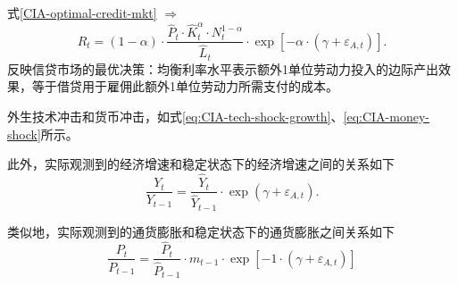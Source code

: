 式\eqref{CIA-optimal-credit-mkt} $\Rightarrow$
\begin{equation}
  \label{CIA-optimal-credit-mkt-scal}
  R_t = \left( 1-\alpha \right) \cdot \frac{\hat{P}_t \cdot \hat{K}_t^{\alpha} \cdot N_t^{1 - \alpha}}{\hat{L}_t} \cdot \exp \left[ -\alpha \cdot \left( \gamma + \varepsilon_{A,t} \right) \right].
\end{equation}
反映信贷市场的最优决策：均衡利率水平表示额外1单位劳动力投入的边际产出效果，等于借贷用于雇佣此额外1单位劳动力所需支付的成本。

外生技术冲击和货币冲击，如式\eqref{eq:CIA-tech-shock-growth}、\eqref{eq:CIA-money-shock}所示。

此外，实际观测到的经济增速和稳定状态下的经济增速之间的关系如下
\begin{equation}
  \label{eq:CIA-gdp-growth-obs-stab}
  \frac{Y_t}{Y_{t-1}}=\frac{\hat{Y}_t}{\hat{Y}_{t-1}} \cdot \exp \left( \gamma + \varepsilon_{A,t} \right).
\end{equation}

类似地，实际观测到的通货膨胀和稳定状态下的通货膨胀之间关系如下
\begin{equation}
  \label{eq:CIA-inflation-obs-stab}
  \frac{P_t}{P_{t-1}} = \frac{\hat{P}_{t}}{\hat{P}_{t-1}} \cdot m_{t-1} \cdot \exp \left[ -1 \cdot \left( \gamma + \varepsilon_{A,t} \right) \right]
\end{equation}
